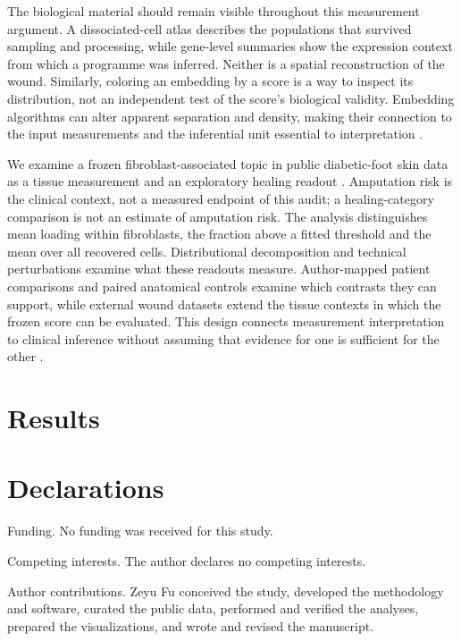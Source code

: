 \documentclass[10pt,a4paper]{article}
\begin{document}
The biological material should remain visible throughout this measurement argument. A dissociated-cell atlas describes the populations that survived sampling and processing, while gene-level summaries show the expression context from which a programme was inferred. Neither is a spatial reconstruction of the wound. Similarly, coloring an embedding by a score is a way to inspect its distribution, not an independent test of the score's biological validity. Embedding algorithms can alter apparent separation and density, making their connection to the input measurements and the inferential unit essential to interpretation \citep{becht2019,huang2022visualization}.

We examine a frozen fibroblast-associated topic in public diabetic-foot skin data as a tissue measurement and an exploratory healing readout \citep{theocharidis2022,cronbach1955}. Amputation risk is the clinical context, not a measured endpoint of this audit; a healing-category comparison is not an estimate of amputation risk. The analysis distinguishes mean loading within fibroblasts, the fraction above a fitted threshold and the mean over all recovered cells. Distributional decomposition and technical perturbations examine what these readouts measure. Author-mapped patient comparisons and paired anatomical controls examine which contrasts they can support, while external wound datasets extend the tissue contexts in which the frozen score can be evaluated. This design connects measurement interpretation to clinical inference without assuming that evidence for one is sufficient for the other \citep{collins2015}.



\section{Results}



\section*{Declarations}
Funding. No funding was received for this study.

Competing interests. The author declares no competing interests.

Author contributions. Zeyu Fu conceived the study, developed the methodology and software, curated the public data, performed and verified the analyses, prepared the visualizations, and wrote and revised the manuscript.
\end{document}
